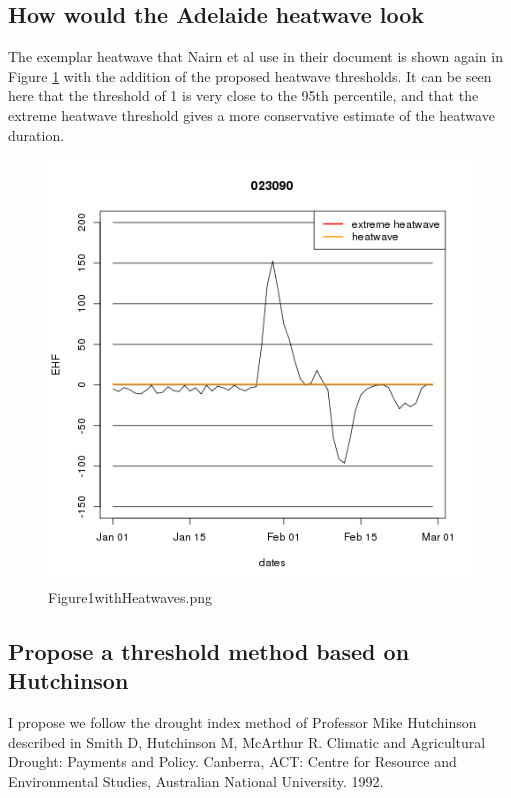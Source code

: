 \documentclass[a4paper]{article}
\begin{document}
\subsection{How would the Adelaide heatwave look}

The exemplar heatwave that Nairn et al use in their document is shown again in Figure \ref{fig:Figure1withHeatwaves.png} with the addition of the proposed heatwave thresholds.  It can be seen here that the threshold of 1 is very close to the 95th percentile, and that the extreme heatwave threshold gives a more conservative estimate of the heatwave duration.
 

\begin{figure}[!h]
\centering
\includegraphics[width=\textwidth]{Figure1withHeatwaves.png}
\caption{Figure1withHeatwaves.png}
\label{fig:Figure1withHeatwaves.png}
\end{figure}
\clearpage

\subsection{Propose a threshold method based on Hutchinson}

I propose we follow the drought index method of Professor Mike Hutchinson described in Smith D, Hutchinson M, McArthur R. Climatic and Agricultural Drought: Payments and Policy. Canberra, ACT: Centre for Resource and Environmental Studies, Australian National University. 1992.  
 
\end{document}
